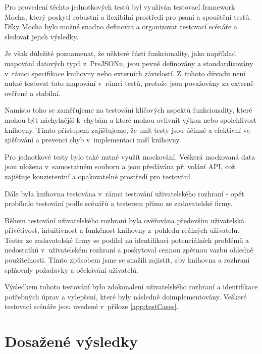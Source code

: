 \documentclass[czech, bc, kiv, he, iso690numb, viewonly]{fasthesis} %
\begin{document}
Pro provedení těchto jednotkových testů byl využíván testovací framework Mocha, který poskytl robustní a flexibilní prostředí pro psaní a spouštění testů. 
Díky Mocha bylo možné snadno definovat a organizovat testovací scénáře a sledovat jejich výsledky.

Je však důležité poznamenat, že některé části funkcionality, jako například mapování datových typů z~PreJSONu, jsou pevně definovány a standardizovány v~rámci specifikace knihovny nebo externích závislostí. 
Z~tohoto důvodu není nutné testovat tato mapování v~rámci testů, protože jsou považovány za externě ověřené a stabilní.

Namísto toho se zaměřujeme na testování klíčových aspektů funkcionality, které mohou být náchylnější k~chybám a které mohou ovlivnit výkon nebo spolehlivost knihovny. 
Tímto přístupem zajišťujeme, že unit testy jsou účinné a efektivní ve zjišťování a prevenci chyb v~implementaci naší knihovny.

Pro jednotkové testy bylo také nutné využít mockování. Veškerá mockovaná data jsou uložena v~samostatném souboru a jsou předávána při volání API, 
což zajišťuje konzistentní a opakovatelné prostředí pro testování.

Dále byla knihovna testována v~rámci testování uživatelského rozhraní - opět probíhalo testování podle scénářů a testerem přímo ze zadavatelské firmy.

Během testování uživatelského rozhraní byla ověřována především uživatelská přívětivost, intuitivnost a funkčnost knihovny z~pohledu reálných uživatelů. 
Tester ze zadavatelské firmy se podílel na identifikaci potenciálních problémů a nedostatků v~uživatelském rozhraní a poskytoval cennou zpětnou vazbu ohledně použitelnosti.
Tímto způsobem jsme se snažili zajistit, aby knihovna a rozhraní splňovaly požadavky a očekávání uživatelů.

Výsledkem tohoto testování bylo zdokonalení uživatelského rozhraní a identifikace potřebných úprav a vylepšení, které byly následně doimplementovány. Veškeré testovací scénáře
jsou uvedené v~příloze \ref{app:testCases}.

\section{Dosažené výsledky}
\end{document}

